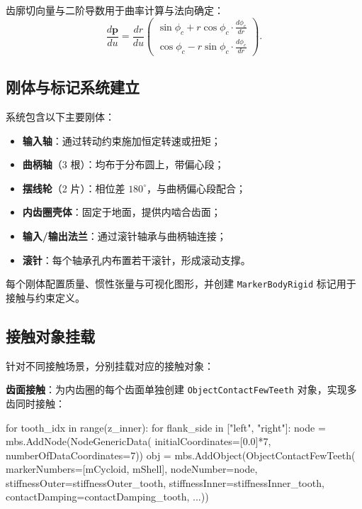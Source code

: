 \documentclass[12pt]{ctexart}
\begin{document}
齿廓切向量与二阶导数用于曲率计算与法向确定：
\begin{equation}
\frac{d\mathbf{p}}{du} = \frac{dr}{du}\begin{pmatrix} \sin\phi_c + r\cos\phi_c \cdot \frac{d\phi_c}{dr} \\ \cos\phi_c - r\sin\phi_c \cdot \frac{d\phi_c}{dr} \end{pmatrix}.
\end{equation}

\subsection{刚体与标记系统建立}

系统包含以下主要刚体：
\begin{itemize}
  \item \textbf{输入轴}：通过转动约束施加恒定转速或扭矩；
  \item \textbf{曲柄轴}（3 根）：均布于分布圆上，带偏心段；
  \item \textbf{摆线轮}（2 片）：相位差 $180^\circ$，与曲柄偏心段配合；
  \item \textbf{内齿圈壳体}：固定于地面，提供内啮合齿面；
  \item \textbf{输入/输出法兰}：通过滚针轴承与曲柄轴连接；
  \item \textbf{滚针}：每个轴承孔内布置若干滚针，形成滚动支撑。
\end{itemize}

每个刚体配置质量、惯性张量与可视化图形，并创建 \texttt{MarkerBodyRigid} 标记用于接触与约束定义。

\subsection{接触对象挂载}

针对不同接触场景，分别挂载对应的接触对象：

\textbf{齿面接触}：为内齿圈的每个齿面单独创建 \texttt{ObjectContactFewTeeth} 对象，实现多齿同时接触：

\begin{pythoncode}[齿面接触对象创建]
for tooth_idx in range(z_inner):
    for flank_side in ["left", "right"]:
        node = mbs.AddNode(NodeGenericData(
            initialCoordinates=[0.0]*7,
            numberOfDataCoordinates=7))
        obj = mbs.AddObject(ObjectContactFewTeeth(
            markerNumbers=[mCycloid, mShell],
            nodeNumber=node,
            stiffnessOuter=stiffnessOuter_tooth,
            stiffnessInner=stiffnessInner_tooth,
            contactDamping=contactDamping_tooth,
            ...))
\end{pythoncode}
\end{document}
